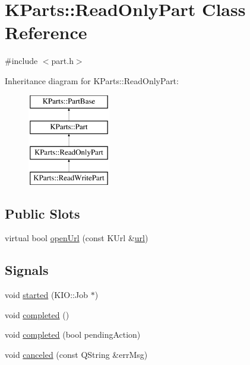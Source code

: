 \hypertarget{classKParts_1_1ReadOnlyPart}{\section{\-K\-Parts\-:\-:\-Read\-Only\-Part \-Class \-Reference}
\label{classKParts_1_1ReadOnlyPart}
}


{\ttfamily \#include $<$part.\-h$>$}

\-Inheritance diagram for \-K\-Parts\-:\-:\-Read\-Only\-Part\-:\begin{figure}[H]
\begin{center}
\leavevmode
\includegraphics[height=4.000000cm]{classKParts_1_1ReadOnlyPart}
\end{center}
\end{figure}
\subsection*{\-Public \-Slots}
\begin{DoxyCompactItemize}
\item 
virtual bool \hyperlink{classKParts_1_1ReadOnlyPart_a1ff41b28f8da57ccc380e0c092a50c0c}{open\-Url} (const \-K\-Url \&\hyperlink{classKParts_1_1ReadOnlyPart_a5b8edbf05a338814287496882adde559}{url})
\end{DoxyCompactItemize}
\subsection*{\-Signals}
\begin{DoxyCompactItemize}
\item 
void \hyperlink{classKParts_1_1ReadOnlyPart_a1839e6f2741b7fca77cd4b04b5acdc6d}{started} (\-K\-I\-O\-::\-Job $\ast$)
\item 
void \hyperlink{classKParts_1_1ReadOnlyPart_a7dbe7a0dd64ed631d7d7fc763167de31}{completed} ()
\item 
void \hyperlink{classKParts_1_1ReadOnlyPart_a48ddc679f4b303102237f8e33b29c904}{completed} (bool pending\-Action)
\item 
void \hyperlink{classKParts_1_1ReadOnlyPart_ab1083f7c30e868d66e1f326b94851d8c}{canceled} (const \-Q\-String \&err\-Msg)
\end{DoxyCompactItemize}

